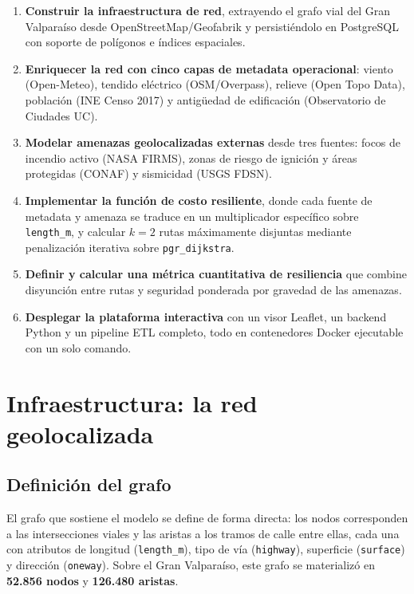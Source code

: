 \documentclass[conference]{IEEEtran}
\begin{document}
\begin{enumerate}[label=\arabic*.,leftmargin=1.4em,itemsep=2pt]
\item \textbf{Construir la infraestructura de red}, extrayendo el grafo vial del Gran Valparaíso desde OpenStreetMap/Geofabrik y persistiéndolo en PostgreSQL con soporte de polígonos e índices espaciales.
\item \textbf{Enriquecer la red con cinco capas de metadata operacional}: viento (Open-Meteo), tendido eléctrico (OSM/Overpass), relieve (Open Topo Data), población (INE Censo 2017) y antigüedad de edificación (Observatorio de Ciudades UC).
\item \textbf{Modelar amenazas geolocalizadas externas} desde tres fuentes: focos de incendio activo (NASA FIRMS), zonas de riesgo de ignición y áreas protegidas (CONAF) y sismicidad (USGS FDSN).
\item \textbf{Implementar la función de costo resiliente}, donde cada fuente de metadata y amenaza se traduce en un multiplicador específico sobre \texttt{length\_m}, y calcular $k=2$ rutas máximamente disjuntas mediante penalización iterativa sobre \texttt{pgr\_dijkstra}.
\item \textbf{Definir y calcular una métrica cuantitativa de resiliencia} que combine disyunción entre rutas y seguridad ponderada por gravedad de las amenazas.
\item \textbf{Desplegar la plataforma interactiva} con un visor Leaflet, un backend Python y un pipeline ETL completo, todo en contenedores Docker ejecutable con un solo comando.
\end{enumerate}

\section{Infraestructura: la red geolocalizada}
\label{sec:infraestructura}

\subsection{Definición del grafo}

El grafo que sostiene el modelo se define de forma directa: los nodos corresponden a las intersecciones viales y las aristas a los tramos de calle entre ellas, cada una con atributos de longitud (\texttt{length\_m}), tipo de vía (\texttt{highway}), superficie (\texttt{surface}) y dirección (\texttt{oneway}). Sobre el Gran Valparaíso, este grafo se materializó en \textbf{52.856 nodos} y \textbf{126.480 aristas}.
\end{document}
